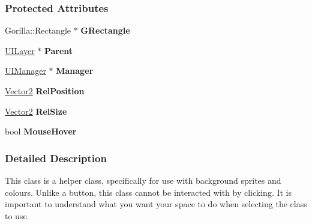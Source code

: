 \subsubsection*{Protected Attributes}
\begin{DoxyCompactItemize}
\item 
\hypertarget{classphys_1_1UI_1_1Rectangle_a2646b0bcc1602757852c21fd70e169cc}{
Gorilla::Rectangle $\ast$ {\bfseries GRectangle}}
\label{d1/d5d/classphys_1_1UI_1_1Rectangle_a2646b0bcc1602757852c21fd70e169cc}

\item 
\hypertarget{classphys_1_1UI_1_1Rectangle_a8685d6c077cc0b5cfe315b9c167db1e7}{
\hyperlink{classphys_1_1UILayer}{UILayer} $\ast$ {\bfseries Parent}}
\label{d1/d5d/classphys_1_1UI_1_1Rectangle_a8685d6c077cc0b5cfe315b9c167db1e7}

\item 
\hypertarget{classphys_1_1UI_1_1Rectangle_a3c78c2e48573d00290f3374e53971a4c}{
\hyperlink{classphys_1_1UIManager}{UIManager} $\ast$ {\bfseries Manager}}
\label{d1/d5d/classphys_1_1UI_1_1Rectangle_a3c78c2e48573d00290f3374e53971a4c}

\item 
\hypertarget{classphys_1_1UI_1_1Rectangle_ae059b550f2d6c490f769bcab07b37910}{
\hyperlink{classphys_1_1Vector2}{Vector2} {\bfseries RelPosition}}
\label{d1/d5d/classphys_1_1UI_1_1Rectangle_ae059b550f2d6c490f769bcab07b37910}

\item 
\hypertarget{classphys_1_1UI_1_1Rectangle_acac4d6cf1b71363d9c27f900b215667e}{
\hyperlink{classphys_1_1Vector2}{Vector2} {\bfseries RelSize}}
\label{d1/d5d/classphys_1_1UI_1_1Rectangle_acac4d6cf1b71363d9c27f900b215667e}

\item 
\hypertarget{classphys_1_1UI_1_1Rectangle_a98b63e58485ebb065c1ad62dc39ac63b}{
bool {\bfseries MouseHover}}
\label{d1/d5d/classphys_1_1UI_1_1Rectangle_a98b63e58485ebb065c1ad62dc39ac63b}

\end{DoxyCompactItemize}


\subsubsection{Detailed Description}
This class is a helper class, specifically for use with background sprites and colours. Unlike a button, this class cannot be interacted with by clicking. It is important to understand what you want your space to do when selecting the class to use. 

